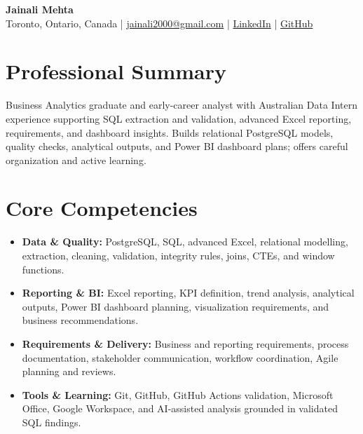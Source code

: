 \documentclass[letterpaper,10pt]{article}
\begin{document}
\begin{center}
  {\fontsize{17}{19}\selectfont\textbf{Jainali Mehta}}\\[2pt]
  \small Toronto, Ontario, Canada \;|\;
  \href{mailto:jainali2000@gmail.com}{jainali2000@gmail.com} \;|\;
  \href{https://www.linkedin.com/in/jainali-mehta}{LinkedIn} \;|\;
  \href{https://github.com/jainalimehta}{GitHub}
\end{center}
\vspace{-7pt}

\section{Professional Summary}
\small Business Analytics graduate and early-career analyst with Australian Data Intern experience supporting SQL extraction and validation, advanced Excel reporting, requirements, and dashboard insights. Builds relational PostgreSQL models, quality checks, analytical outputs, and Power BI dashboard plans; offers careful organization and active learning.

\section{Core Competencies}
\begin{itemize}[leftmargin=0.16in,label=\textbullet,topsep=0pt,itemsep=1pt,parsep=0pt]
  \item \small \textbf{Data \& Quality:} PostgreSQL, SQL, advanced Excel, relational modelling, extraction, cleaning, validation, integrity rules, joins, CTEs, and window functions.
  \item \small \textbf{Reporting \& BI:} Excel reporting, KPI definition, trend analysis, analytical outputs, Power BI dashboard planning, visualization requirements, and business recommendations.
  \item \small \textbf{Requirements \& Delivery:} Business and reporting requirements, process documentation, stakeholder communication, workflow coordination, Agile planning and reviews.
  \item \small \textbf{Tools \& Learning:} Git, GitHub, GitHub Actions validation, Microsoft Office, Google Workspace, and AI-assisted analysis grounded in validated SQL findings.
\end{itemize}
\end{document}
